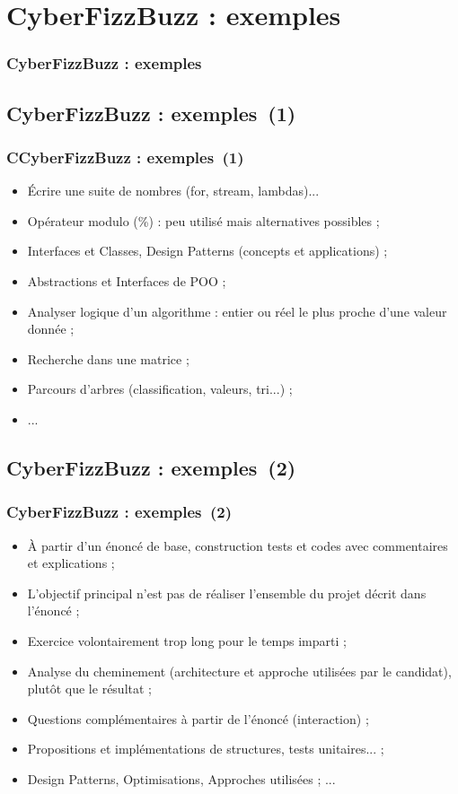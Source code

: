 \documentclass{beamer}
\begin{document}
\def\titleExemplesCyberFizzBuzz{CyberFizzBuzz : exemples}
\section{\titleExemplesCyberFizzBuzz }
\begin{frame}
	\frametitle{\titleExemplesCyberFizzBuzz }
	\tableofcontents[sections=3,currentsection,subsectionstyle=show/shaded/hide]
\end{frame} 

\subsection{\titleExemplesCyberFizzBuzz ~(1)}
\begin{frame}
	\frametitle{C\titleExemplesCyberFizzBuzz ~(1)}
	\begin{itemize}
		\item {\'E}crire une suite de nombres (for, stream, lambdas)...
		\item Op{\'e}rateur modulo (\%) : peu utilis{\'e} mais alternatives possibles ; 
		\item Interfaces et Classes, Design Patterns (concepts et applications) ; 
		\item Abstractions et Interfaces de POO ; 
		\item Analyser logique d'un algorithme : entier ou r{\'e}el le plus proche d'une valeur donn{\'e}e ; 
		\item Recherche dans une matrice ; 
		\item Parcours d'arbres (classification, valeurs, tri...) ; 
		\item ... 
	\end{itemize}
\end{frame} 

\subsection{\titleExemplesCyberFizzBuzz ~(2)}
\begin{frame}
	\frametitle{\titleExemplesCyberFizzBuzz ~(2)}
	\begin{itemize}
		\item {\`A} partir d'un {\'e}nonc{\'e} de base, construction tests et codes avec commentaires et explications ; 
		\item L'objectif principal n'est pas de r{\'e}aliser l'ensemble du projet d{\'e}crit dans l'{\'e}nonc{\'e} ; 
		\item Exercice volontairement trop long pour le temps imparti ; 
		\item Analyse du cheminement (architecture et approche utilis{\'e}es par le candidat), plut{\^o}t que le r{\'e}sultat ;
		\item Questions compl{\'e}mentaires {\`a} partir de l'{\'e}nonc{\'e} (interaction) ; 
		\item Propositions et impl{\'e}mentations de structures, tests unitaires... ;
		\item Design Patterns, Optimisations, Approches utilis{\'e}es ; ... 
	\end{itemize}
\end{frame} 
\end{document}
